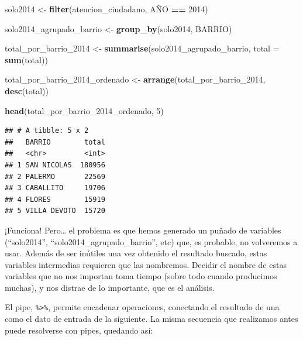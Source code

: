 \documentclass[]{book}
\newenvironment{Shaded}{\begin{snugshade}}{\end{snugshade}}
\newcommand{\KeywordTok}[1]{\textcolor[rgb]{0.13,0.29,0.53}{\textbf{#1}}}
\newcommand{\DataTypeTok}[1]{\textcolor[rgb]{0.13,0.29,0.53}{#1}}
\newcommand{\DecValTok}[1]{\textcolor[rgb]{0.00,0.00,0.81}{#1}}
\newcommand{\StringTok}[1]{\textcolor[rgb]{0.31,0.60,0.02}{#1}}
\newcommand{\OperatorTok}[1]{\textcolor[rgb]{0.81,0.36,0.00}{\textbf{#1}}}
\newcommand{\NormalTok}[1]{#1}
\begin{document}
\begin{Shaded}
\begin{Highlighting}[]
\NormalTok{solo2014 <-}\StringTok{ }\KeywordTok{filter}\NormalTok{(atencion_ciudadano, AÑO }\OperatorTok{==}\StringTok{ }\DecValTok{2014}\NormalTok{)}

\NormalTok{solo2014_agrupado_barrio <-}\StringTok{ }\KeywordTok{group_by}\NormalTok{(solo2014, BARRIO)}

\NormalTok{total_por_barrio_}\DecValTok{2014}\NormalTok{ <-}\StringTok{ }\KeywordTok{summarise}\NormalTok{(solo2014_agrupado_barrio, }\DataTypeTok{total =} \KeywordTok{sum}\NormalTok{(total))}

\NormalTok{total_por_barrio_2014_ordenado <-}\StringTok{ }\KeywordTok{arrange}\NormalTok{(total_por_barrio_}\DecValTok{2014}\NormalTok{, }\KeywordTok{desc}\NormalTok{(total))}

\KeywordTok{head}\NormalTok{(total_por_barrio_2014_ordenado, }\DecValTok{5}\NormalTok{)}
\end{Highlighting}
\end{Shaded}

\begin{verbatim}
## # A tibble: 5 x 2
##   BARRIO        total
##   <chr>         <int>
## 1 SAN NICOLAS  180956
## 2 PALERMO       22569
## 3 CABALLITO     19706
## 4 FLORES        15919
## 5 VILLA DEVOTO  15720
\end{verbatim}

¡Funciona! Pero\ldots{} el problema es que hemos generado un puñado de
variables (``solo2014'', ``solo2014\_agrupado\_barrio'', etc) que, es
probable, no volveremos a usar. Además de ser inútiles una vez obtenido
el resultado buscado, estas variables intermedias requieren que las
nombremos. Decidir el nombre de estas variables que no nos importan toma
tiempo (sobre todo cuando producimos muchas), y nos distrae de lo
importante, que es el análisis.

El pipe, \texttt{\%\textgreater{}\%}, permite encadenar operaciones,
conectando el resultado de una como el dato de entrada de la siguiente.
La misma secuencia que realizamos antes puede resolverse con pipes,
quedando así:

\begin{Shaded}
\end{Shaded}
\end{document}
